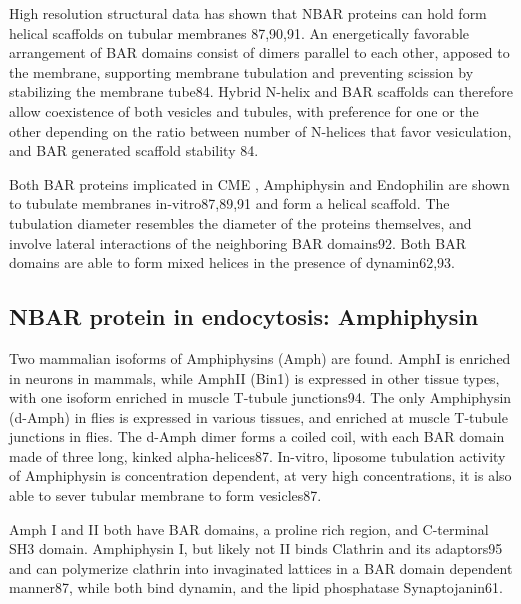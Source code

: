 	\vspace{5mm}
	High resolution structural data has shown that NBAR proteins can hold form helical scaffolds on tubular membranes 87,90,91. An energetically favorable arrangement of BAR domains consist of dimers parallel to each other, apposed to the membrane, supporting membrane tubulation and preventing scission by stabilizing the membrane tube84. Hybrid N-helix and BAR scaffolds can therefore allow coexistence of both vesicles and tubules, with preference for one or the other depending on the ratio between number of N-helices that favor vesiculation, and BAR generated scaffold stability 84. 


	\vspace{5mm}
	Both BAR proteins implicated in CME , Amphiphysin and Endophilin are shown to tubulate membranes in-vitro87,89,91 and form a helical scaffold. The tubulation diameter resembles the diameter of the proteins themselves, and involve lateral interactions of the neighboring BAR domains92. Both BAR domains are able to form mixed helices in the presence of dynamin62,93. 


	\subsection{NBAR protein in endocytosis: Amphiphysin }		
	Two mammalian isoforms of Amphiphysins (Amph) are found. AmphI is enriched in neurons in mammals, while AmphII (Bin1) is expressed in other tissue types, with one isoform enriched in muscle T-tubule junctions94. The only Amphiphysin (d-Amph) in flies is expressed in various tissues, and enriched at muscle T-tubule junctions in flies. The d-Amph dimer forms a coiled coil, with each BAR domain made of three long, kinked alpha-helices87. In-vitro, liposome tubulation activity of Amphiphysin is concentration dependent, at very high concentrations, it is also able to sever tubular membrane to form vesicles87. 


	\vspace{5mm}
	Amph I and II both have BAR domains, a proline rich region, and C-terminal SH3 domain.
Amphiphysin I, but likely not II binds Clathrin and its adaptors95 and can polymerize clathrin into invaginated lattices in a BAR domain dependent manner87, while both bind dynamin, and the lipid phosphatase Synaptojanin61.


